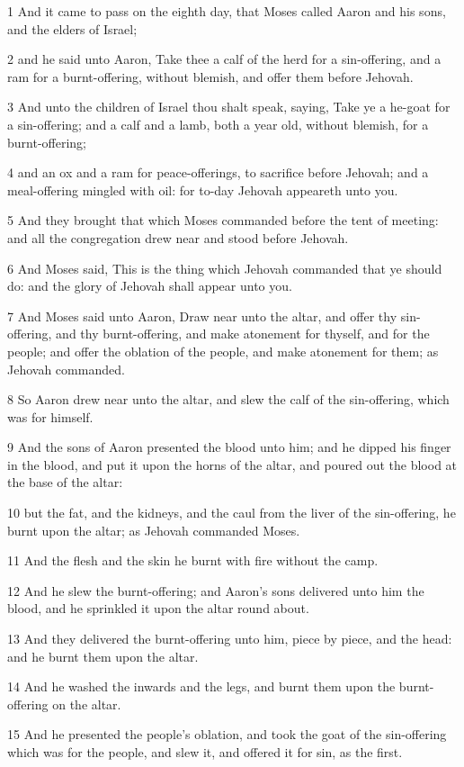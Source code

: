 \par 1 And it came to pass on the eighth day, that Moses called Aaron and his sons, and the elders of Israel;
\par 2 and he said unto Aaron, Take thee a calf of the herd for a sin-offering, and a ram for a burnt-offering, without blemish, and offer them before Jehovah.
\par 3 And unto the children of Israel thou shalt speak, saying, Take ye a he-goat for a sin-offering; and a calf and a lamb, both a year old, without blemish, for a burnt-offering;
\par 4 and an ox and a ram for peace-offerings, to sacrifice before Jehovah; and a meal-offering mingled with oil: for to-day Jehovah appeareth unto you.
\par 5 And they brought that which Moses commanded before the tent of meeting: and all the congregation drew near and stood before Jehovah.
\par 6 And Moses said, This is the thing which Jehovah commanded that ye should do: and the glory of Jehovah shall appear unto you.
\par 7 And Moses said unto Aaron, Draw near unto the altar, and offer thy sin-offering, and thy burnt-offering, and make atonement for thyself, and for the people; and offer the oblation of the people, and make atonement for them; as Jehovah commanded.
\par 8 So Aaron drew near unto the altar, and slew the calf of the sin-offering, which was for himself.
\par 9 And the sons of Aaron presented the blood unto him; and he dipped his finger in the blood, and put it upon the horns of the altar, and poured out the blood at the base of the altar:
\par 10 but the fat, and the kidneys, and the caul from the liver of the sin-offering, he burnt upon the altar; as Jehovah commanded Moses.
\par 11 And the flesh and the skin he burnt with fire without the camp.
\par 12 And he slew the burnt-offering; and Aaron's sons delivered unto him the blood, and he sprinkled it upon the altar round about.
\par 13 And they delivered the burnt-offering unto him, piece by piece, and the head: and he burnt them upon the altar.
\par 14 And he washed the inwards and the legs, and burnt them upon the burnt-offering on the altar.
\par 15 And he presented the people's oblation, and took the goat of the sin-offering which was for the people, and slew it, and offered it for sin, as the first.
